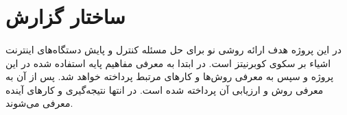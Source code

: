 \section{ساختار گزارش}
\paragraph{}
{
    در این پروژه هدف ارائه 
    روشی نو برای حل مسئله کنترل و پایش دستگاه‌های اینترنت اشیاء بر سکوی کوبرنیتز است. 
    در ابتدا به معرفی مفاهیم پایه استفاده شده در این پروژه 
    و سپس به معرفی روش‌ها و کارهای مرتبط پرداخته‌ 
    خواهد شد. پس از آن به معرفی 
    روش و ارزیابی آن پرداخته شده است. در انتها نتیجه‌گیری و 
    کارهای آینده معرفی می‌شوند. 


}